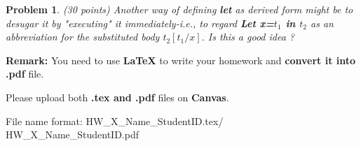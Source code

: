 \documentclass[12pt]{article}
\newtheorem{hw}{Problem}
\begin{document}
\begin{hw}\rm (30 points)
	Another way of defining \textbf{let} as derived form might be to desugar it by "executing" it immediately-i.e., to regard \textbf{Let x=$t_1$ in $t_2$} as an abbreviation for the substituted body \textbf{$t_2[t_1/x]$}. Is this a good idea ?
\end{hw}

\vspace{20pt}

\textbf{Remark:} 
You need to use \textbf{LaTeX} to write your homework and \textbf{convert it into .pdf} file.

Please upload both \textbf{.tex and .pdf} files on \textbf{Canvas}.

File name format: {\color{red} HW\_X\_Name\_StudentID.tex/\color{red} HW\_X\_Name\_StudentID.pdf}
\end{document}
